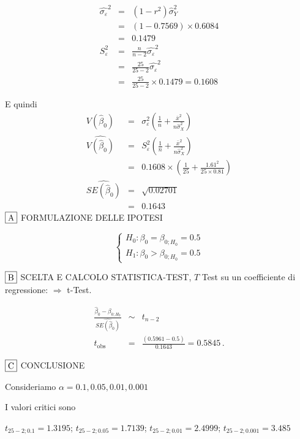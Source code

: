 \documentclass[
  11pt,
]{book}
\theoremstyle{mytheoremstyle}
\theoremstyle{mydefstyle}
\newenvironment{sol}
  {
  \begin{tcolorbox}[enhanced,breakable,arc=0.1mm,boxrule=1pt,colback=white,colframe=iblue,
  title=\bf \fontfamily{lmss}\selectfont \hspace{.5 cm} Soluzione,drop fuzzy shadow]

}{
\end{tcolorbox}
  }
\begin{document}
\begin{sol}
\begin{eqnarray*}
\hat{\sigma_\varepsilon}^2&=&(1-r^2)\hat\sigma_Y^2\\
&=& (1- 0.7569 )\times 0.6084 \\
   &=&  0.1479 \\
   S_\varepsilon^2 &=& \frac{n} {n-2} \hat{\sigma_\varepsilon}^2\\
   &=&  \frac{ 25 } { 25 -2} \hat{\sigma_\varepsilon}^2 \\
 &=&  \frac{ 25 } { 25 -2} \times  0.1479  =  0.1608  
\end{eqnarray*}

E quindi\begin{eqnarray*}
V(\hat\beta_{0}) &=& \sigma_{\varepsilon}^{2} \left( \frac{1} {n}  +  \frac{\bar{x}^{2}} {n \hat{\sigma}^{2}_{X}} \right)\\
\widehat{V(\hat\beta_{0})} &=& S_{\varepsilon}^{2}\left( \frac{1} {n}  +  \frac{\bar{x}^{2}} {n \hat{\sigma}^{2}_{X}} \right)\ \\
 &=&  0.1608 \times\left( \frac{1} { 25 }  +  \frac{ 1.61 ^{2}} { 25 \times  0.81 } \right)\\
 \widehat{SE(\hat\beta_{0})}        &=&  \sqrt{ 0.02701 }\\
 &=&  0.1643 
\end{eqnarray*} \(\fbox{A}\) FORMULAZIONE DELLE IPOTESI

\[\begin{cases}
   H_0: \beta_0 = \beta_{0;H_0}=0.5 \\
   H_1: \beta_0 > \beta_{0;H_0}=0.5 
   \end{cases}\]

\(\fbox{B}\) SCELTA E CALCOLO STATISTICA-TEST, \(T\)
Test su un coefficiente di regressione: \(\Rightarrow\) t-Test.

\begin{eqnarray*}
 \frac{\hat\beta_{ 0 } - \beta_{ 0 ;H_0}} {\widehat{SE(\hat\beta_{ 0 })}}&\sim&t_{n-2}\\
   t_{\text{obs}}
&=& \frac{ ( 0.5961 -  0.5 )} { 0.1643 }
 =   0.5845 \, .
\end{eqnarray*}

\(\fbox{C}\) CONCLUSIONE

Consideriamo \(\alpha=0.1, 0.05, 0.01, 0.001\)

I valori critici sono

\(t_{25-2;0.1}=1.3195\); \(t_{25-2;0.05}=1.7139\); \(t_{25-2;0.01}=2.4999\); \(t_{25-2;0.001}=3.485\)


\end{sol}
\end{document}
